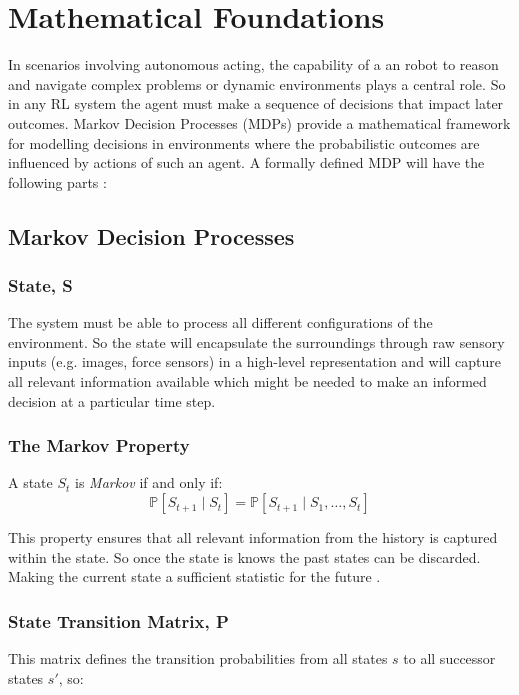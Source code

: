 \section{Mathematical Foundations}

  In scenarios involving autonomous acting, the capability of a an robot to reason and navigate complex problems or dynamic environments plays a central role. So in any RL system the agent must make a sequence of decisions that impact later outcomes. Markov Decision Processes (MDPs) provide a mathematical framework for modelling decisions in environments where the probabilistic outcomes are influenced by actions of such an agent. A formally defined MDP will have the following parts \cite{silver2015}:

\subsection{Markov Decision Processes}
  \label{subsec:mdp}
  \subsubsection{State, S}
    The system must be able to process all different configurations of the environment. So the state will encapsulate the surroundings through raw sensory inputs (e.g. images, force sensors) in a high-level representation and will capture all relevant information available \cite{Sutton1998} which might be needed to make an informed decision at a particular time step.

  \subsubsection{The Markov Property}
    A state $S_t$ is \emph{Markov} if and only if:
    \[
      \mathbb{P} \left[S_{t+1} \mid S_t\right] = \mathbb{P}\left[ S_{t+1} \mid S_1, \ldots, S_t\right]
    \]

    This property ensures that all relevant information from the history is captured within the state. So once the state is knows the past states can be discarded. Making the current state a sufficient statistic for the future \cite{silver2015}.

  \subsubsection{State Transition Matrix, P}
    This matrix defines the transition probabilities from all states $s$ to all successor states $s'$, so:
    
